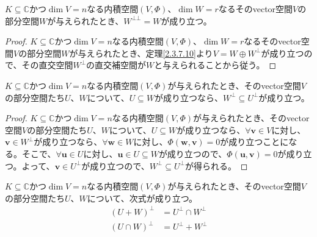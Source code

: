 \documentclass[dvipdfmx]{jsarticle}
\begin{document}
\begin{thm}\label{2.3.7.11}
$K \subseteq \mathbb{C}$かつ$\dim V = n$なる内積空間$(V,\varPhi )$、$\dim W = r$なるそのvector空間$V$の部分空間$W$が与えられたとき、$W^{\bot\bot} = W$が成り立つ。
\end{thm}
\begin{proof}
$K \subseteq \mathbb{C}$かつ$\dim V = n$なる内積空間$(V,\varPhi )$、$\dim W = r$なるそのvector空間$V$の部分空間$W$が与えられたとき、定理\ref{2.3.7.10}より$V = W \oplus W^{\bot}$が成り立つので、その直交空間$W^{\bot}$の直交補空間が$W$と与えられることから従う。
\end{proof}
\begin{thm}\label{2.3.7.12}
$K \subseteq \mathbb{C}$かつ$\dim V = n$なる内積空間$(V,\varPhi )$が与えられたとき、そのvector空間$V$の部分空間たち$U$、$W$について、$U \subseteq W$が成り立つなら、$W^{\bot} \subseteq U^{\bot}$が成り立つ。
\end{thm}
\begin{proof}
$K \subseteq \mathbb{C}$かつ$\dim V = n$なる内積空間$(V,\varPhi )$が与えられたとき、そのvector空間$V$の部分空間たち$U$、$W$について、$U \subseteq W$が成り立つなら、$\forall\mathbf{v} \in V$に対し、$\mathbf{v} \in W^{\bot}$が成り立つなら、$\forall\mathbf{w} \in W$に対し、$\varPhi \left( \mathbf{w},\mathbf{v} \right) = 0$が成り立つことになる。そこで、$\forall\mathbf{u} \in U$に対し、$\mathbf{u} \in U \subseteq W$が成り立つので、$\varPhi \left( \mathbf{u},\mathbf{v} \right) = 0$が成り立つ。よって、$\mathbf{v} \in U^{\bot}$が成り立つので、$W^{\bot} \subseteq U^{\bot}$が得られる。
\end{proof}
\begin{thm}\label{2.3.7.13}
$K \subseteq \mathbb{C}$かつ$\dim V = n$なる内積空間$(V,\varPhi )$が与えられたとき、そのvector空間$V$の部分空間たち$U$、$W$について、次式が成り立つ。
\begin{align*}
(U + W)^{\bot} &= U^{\bot} \cap W^{\bot}\\
(U \cap W)^{\bot} &= U^{\bot} + W^{\bot}
\end{align*}
\end{thm}
\end{document}
